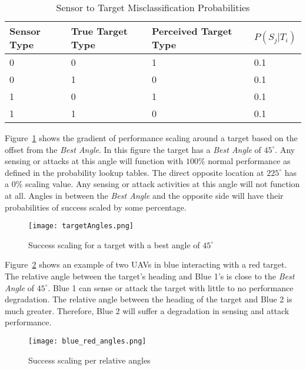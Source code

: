 \begin{table}[H]
	\caption{Sensor to Target Misclassification Probabilities}
	\centering
	\label{tab:snsrTgtMisClassProb}
	\begin{tabular}{|p{1cm}|p{1.25cm}|p{1.6cm}|p{1.5cm}|}
		\hline
		Sensor Type & True Target Type & Perceived Target Type & $P(S_{j}|T_{i})$\\ \hline
		0 & 0 & 1 & 0.1 \\
		0 & 1 & 0 & 0.1 \\
		1 & 0 & 1 & 0.1 \\
		1 & 1 & 0 & 0.1 \\
		\hline
	\end{tabular}
\end{table}

Figure~\ref{fig:targetAngles} shows the gradient of performance scaling around a target based on the offset from the \textit{Best Angle}.  In this figure the target has a \textit{Best Angle} of $45^{\circ}$.  Any sensing or attacks at this angle will function with $100\%$ normal performance as defined in the probability lookup tables.  The direct opposite location at $225^{\circ}$ has a $0\%$ scaling value.  Any sensing or attack activities at this angle will not function at all.  Angles in between the \textit{Best Angle} and the opposite side will have their probabilities of success scaled by some percentage.


\begin{figure}[H]
	\centering
	\texttt{[image: targetAngles.png]}
	\caption{Success scaling for a target with a best angle of $45^{\circ}$}
	\label{fig:targetAngles}
\end{figure}

Figure~\ref{fig:blue_red_angles} shows an example of two UAVs in blue interacting with a red target.  The relative angle between the target's heading and Blue 1's is close to the \textit{Best Angle} of $45^{\circ}$.  Blue 1 can sense or attack the target with little to no performance degradation.  The relative angle between the heading of the target and Blue 2 is much greater.  Therefore, Blue 2 will suffer a degradation in sensing and attack performance.

\begin{figure}[H]
	\centering
	\texttt{[image: blue\_red\_angles.png]}
	\caption{Success scaling per relative angles}
	\label{fig:blue_red_angles}
\end{figure}

